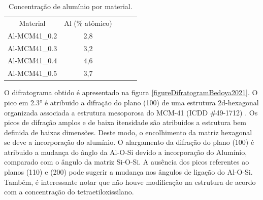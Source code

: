 \begin{table}[]
    \centering
    \begin{threeparttable}
    \caption{Concentração de alumínio por material.}
    \label{tableBedoyaAlConcentration}
    \begin{tabular}{cclll}
    \cline{1-2}
    Material      & Al (\% atômico) &  &  &  \\ \cline{1-2}
    Al-MCM41\_0.2 & 2,8             &  &  &  \\
    Al-MCM41\_0.3 & 3,2             &  &  &  \\
    Al-MCM41\_0.4 & 4,6             &  &  &  \\
    Al-MCM41\_0.5 & 3,7             &  &  &  \\ \cline{1-2}
    \end{tabular}
    \end{threeparttable}
    \end{table}

O difratograma obtido é apresentado na figura \ref{figureDifratogramBedoya2021}. O pico
em 2.3° é atribuido a difração do plano (100) de uma estrutura 2d-hexagonal organizada
associada a estrutura mesoporosa do MCM-41 (ICDD $\#$49-1712) \cite{articleXRDBedoya2021}. Os
picos de difração amplos e de baixa itensidade são atribuidos a estrutura bem definida
de baixas dimensões. Deste modo, o encolhimento da matriz hexagonal se deve a incorporação
do alumínio. O alargamento da difração do plano (100) é atribuido a mudança do ânglo da
Al-O-Si devido a incorporação do Alumínio, comparado com o ângulo da matriz Si-O-Si. A
ausência dos picos referentes ao planos (110) e (200) pode sugerir a mudança nos ângulos
de ligação do Al-O-Si. Também, é interessante notar que não houve modificação na estrutura
de acordo com a concentração do tetraetiloxissilano.

